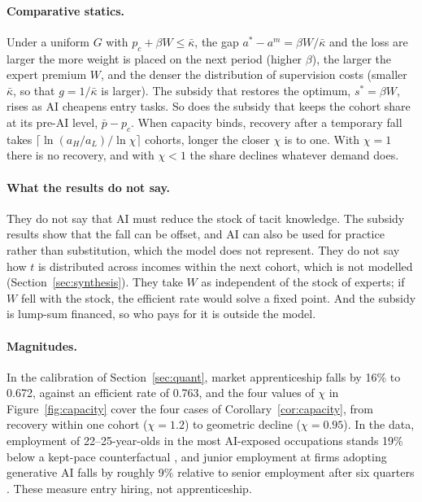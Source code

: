 \documentclass[12pt]{article}
\theoremstyle{remark}
\begin{document}
\paragraph{Comparative statics.} Under a uniform $G$ with $p_c+\beta W\le\bar\kappa$, the gap $a^*-a^m=\beta W/\bar\kappa$ and the loss are larger the more weight is placed on the next period (higher $\beta$), the larger the expert premium $W$, and the denser the distribution of supervision costs (smaller $\bar\kappa$, so that $g=1/\bar\kappa$ is larger). The subsidy that restores the optimum, $s^*=\beta W$, rises as AI cheapens entry tasks. So does the subsidy that keeps the cohort share at its pre-AI level, $\bar p-p_c$. When capacity binds, recovery after a temporary fall takes $\lceil\ln(a_H/a_L)/\ln\chi\rceil$ cohorts, longer the closer $\chi$ is to one. With $\chi=1$ there is no recovery, and with $\chi<1$ the share declines whatever demand does.

\paragraph{What the results do not say.} They do not say that AI must reduce the stock of tacit knowledge. The subsidy results show that the fall can be offset, and AI can also be used for practice rather than substitution, which the model does not represent. They do not say how $t$ is distributed across incomes within the next cohort, which is not modelled (Section~\ref{sec:synthesis}). They take $W$ as independent of the stock of experts; if $W$ fell with the stock, the efficient rate would solve a fixed point. And the subsidy is lump-sum financed, so who pays for it is outside the model.

\paragraph{Magnitudes.} In the calibration of Section~\ref{sec:quant}, market apprenticeship falls by 16\% to 0.672, against an efficient rate of 0.763, and the four values of $\chi$ in Figure~\ref{fig:capacity} cover the four cases of Corollary~\ref{cor:capacity}, from recovery within one cohort ($\chi=1.2$) to geometric decline ($\chi=0.95$). In the data, employment of 22--25-year-olds in the most AI-exposed occupations stands 19\% below a kept-pace counterfactual \citep[August 2026 version, p.~2]{brynjolfsson2025canaries}, and junior employment at firms adopting generative AI falls by roughly 9\% relative to senior employment after six quarters \citep[June 2026 version, p.~5]{hosseini2025seniority}. These measure entry hiring, not apprenticeship.
\end{document}
